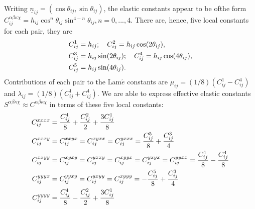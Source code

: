 \documentclass[twoside,twocolumn,9pt]{article}
\begin{document}
Writing $\underline{n}_{ij}=(\cos\theta_{ij},\sin\theta_{ij})$, the elastic constants appear to be ofthe form $C_{ij}^{\alpha\beta\kappa\chi}=h_{ij}\cos^n\theta_{ij}\sin^{4-n}\theta_{ij}, n=0,...,4$. There are, hence, five local constants for each pair, they are~\cite{Gelin2016}
\begin{align}
C_{ij}^1&=h_{ij};\quad
C_{ij}^2=h_{ij}\cos(2\theta_{ij}),\notag\\
C_{ij}^3&=h_{ij}\sin(2\theta_{ij});\quad
C_{ij}^4=h_{ij}\cos(4\theta_{ij}),\notag\\
C_{ij}^5&=h_{ij}\sin(4\theta_{ij}).
\end{align}
Contributions of each pair to the Lam$\acute{e}$ constants are $\mu_{ij}=(1/8)(C_{ij}^1-C_{ij}^4)$ and $\lambda_{ij}=(1/8)(C_{ij}^1+C_{ij}^4)$.
We are able to express effective elastic constants $S^{\alpha\beta\kappa\chi}\approx C^{\alpha\beta\kappa\chi}$ in terms of these five local constants:
\begin{align}
C_{ij}^{xxxx}&=\frac{C_{ij}^4}{8}+\frac{C_{ij}^2}{2}+\frac{3C_{ij}^1}{8}\notag\\
C_{ij}^{xxxy}&=C_{ij}^{xxyx}=C_{ij}^{xyxx}=C_{ij}^{yxxx}=\frac{C_{ij}^5}{8}+\frac{C_{ij}^3}{4}\notag\\
C_{ij}^{xxyy}&=C_{ij}^{xyxy}=C_{ij}^{yxxy}=C_{ij}^{xyyx}=C_{ij}^{yxyx}=C_{ij}^{yyxx}=\frac{C_{ij}^1}{8}-\frac{C_{ij}^4}{8}\notag\\
C_{ij}^{yyyx}&=C_{ij}^{yyxy}=C_{ij}^{yxyy}=C_{ij}^{xyyy}=-\frac{C_{ij}^5}{8}+\frac{C_{ij}^3}{4}\notag\\
C_{ij}^{yyyy}&=\frac{C_{ij}^4}{8}-\frac{C_{ij}^2}{2}+\frac{3C_{ij}^1}{8}
\end{align}
\end{document}
